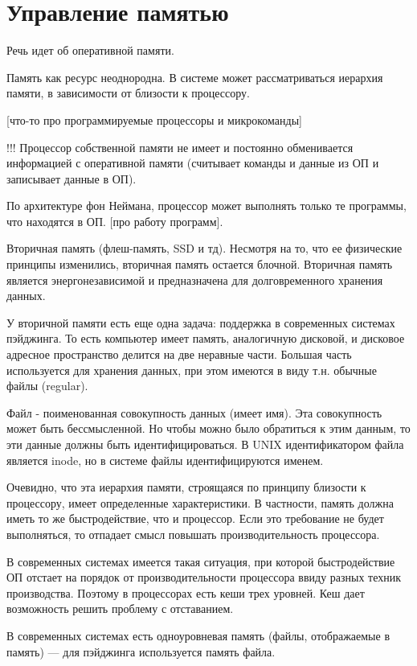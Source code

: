 \documentclass[a4paper, 14pt]{extreport}
\begin{document}
	\chapter{Управление памятью}
	
	Речь идет об оперативной памяти.
	
	Память как ресурс неоднородна. В системе может рассматриваться иерархия памяти, в зависимости от близости к процессору.
	
	[что-то про программируемые процессоры и микрокоманды]
	
	!!! Процессор собственной памяти не имеет и постоянно обменивается информацией с оперативной памяти (считывает команды и данные из ОП и записывает данные в ОП).
	
	По архитектуре фон Неймана, процессор может выполнять только те программы, что находятся в ОП. [про работу программ].
	
	Вторичная память (флеш-память, SSD и тд). Несмотря на то, что ее физические принципы изменились, вторичная память остается блочной. Вторичная память является энергонезависимой и предназначена для долговременного хранения данных.
	
	У вторичной памяти есть еще одна задача: поддержка в современных системах пэйджинга. То есть компьютер имеет память, аналогичную дисковой, и дисковое адресное пространство делится на две неравные части. Большая часть используется для хранения данных, при этом имеются в виду т.н. обычные файлы (regular).
	
	Файл - поименованная совокупность данных (имеет имя). Эта совокупность может быть бессмысленной. Но чтобы можно было обратиться к этим данным, то эти данные должны быть идентифицироваться. В UNIX идентификатором файла является inode, но в системе файлы идентифицируются именем.
	
	Очевидно, что эта иерархия памяти, строящаяся по принципу близости к процессору, имеет определенные характеристики. В частности, память должна иметь то же быстродействие, что и процессор. Если это требование не будет выполняться, то отпадает смысл повышать производительность процессора.
	
	В современных системах имеется такая ситуация, при которой быстродействие ОП отстает на порядок от производительности процессора ввиду разных техник производства. Поэтому в процессорах есть кеши трех уровней. Кеш дает возможность решить проблему с отставанием.
	
	В современных системах есть одноуровневая память (файлы, отображаемые в память) --- для пэйджинга используется память файла.
	
\end{document}

